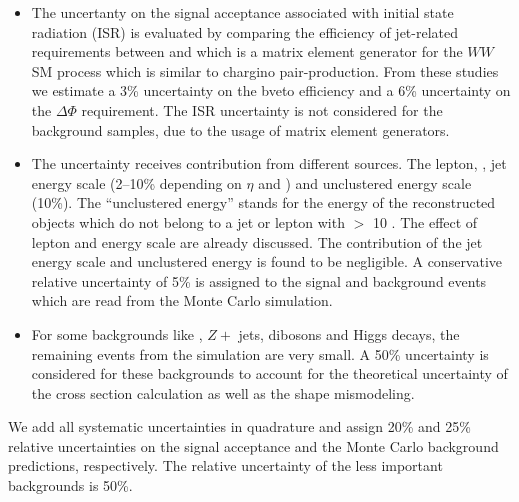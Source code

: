 \begin{itemize}
\item The uncertanty on the signal acceptance associated with initial state
  radiation (ISR) is evaluated by comparing the efficiency of jet-related
  requirements between \PYTHIA and \MADGRAPH which is a matrix element generator 
  for the $WW$ SM process which
  is similar to chargino pair-production.  From these studies we estimate
  a 3\% uncertainty on the bveto efficiency and a 6\% uncertainty on the
  $\Delta \Phi$ requirement.
  The ISR uncertainty is not considered for the background samples, due to the
  usage of  matrix element  generators.


\item The \MET uncertainty receives contribution from different sources. The lepton, \Tau, jet energy scale 
(2–10\% depending on $\eta$ and \PT) and unclustered energy scale (10\%). The ``unclustered energy'' stands for the energy of the 
reconstructed objects which do not belong to a jet or lepton with \PT $>$ 10 \GEV.
The effect of lepton and \Tau energy scale are already discussed. The contribution of the jet energy scale and unclustered energy is 
found to be negligible. A conservative relative uncertainty of 5\% is assigned to the signal and background events which are read from the 
Monte Carlo simulation.
\item For some backgrounds like \ttbar, $Z+$ jets, dibosons and Higgs decays, the remaining 
events from the simulation are very small. A 50\% uncertainty is considered for these backgrounds to account for the theoretical uncertainty of the
cross section calculation as well as the shape mismodeling.
\end{itemize}


\noindent We add all systematic uncertainties in quadrature and assign 
 20\% and 25\% relative uncertainties on the signal
acceptance and the Monte Carlo background predictions, respectively. The relative uncertainty of the 
less important backgrounds is 50\%.

